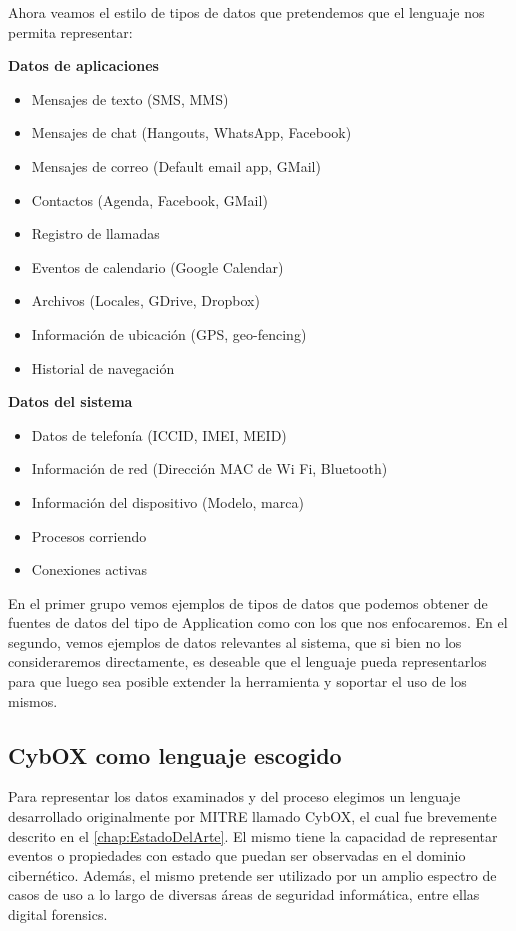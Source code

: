 Ahora veamos el estilo de tipos de datos que pretendemos que el lenguaje nos permita representar:
\newline

\textbf{Datos de aplicaciones}
\begin{itemize}
\item Mensajes de texto (SMS, MMS)
\item Mensajes de chat (Hangouts, WhatsApp, Facebook)
\item Mensajes de correo (Default email app, GMail)
\item Contactos (Agenda, Facebook, GMail)
\item Registro de llamadas
\item Eventos de calendario (Google Calendar)
\item Archivos (Locales, GDrive, Dropbox)
\item Información de ubicación (GPS, geo-fencing)
\item Historial de navegación
\end{itemize}

\textbf{Datos del sistema}
\begin{itemize}
\item Datos de telefonía (ICCID, IMEI, MEID)
\item Información de red (Dirección MAC de Wi Fi, Bluetooth)
\item Información del dispositivo (Modelo, marca)
\item Procesos corriendo
\item Conexiones activas
\end{itemize}

En el primer grupo vemos ejemplos de tipos de datos que podemos obtener de fuentes de datos del tipo de Application como con los que nos enfocaremos. En el segundo, vemos ejemplos de datos relevantes al sistema, que si bien no los consideraremos directamente, es deseable que el lenguaje pueda representarlos para que luego sea posible extender la herramienta y soportar el uso de los mismos.

\subsection{CybOX como lenguaje escogido}
Para representar los datos examinados y del proceso elegimos un lenguaje desarrollado originalmente por MITRE llamado CybOX, el cual fue brevemente descrito en el \autoref{chap:EstadoDelArte}. El mismo tiene la capacidad de representar eventos o propiedades con estado que puedan ser observadas en el dominio cibernético. Además, el mismo pretende ser utilizado por un amplio espectro de casos de uso a lo largo de diversas áreas de seguridad informática, entre ellas digital forensics.

